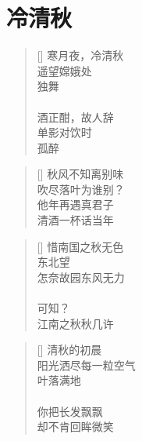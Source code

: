 \chapter{冷清秋}
\thispagestyle{empty}
\renewcommand{\poemtoc}{section}
\settowidth{\versewidth}{寒月夜，冷清秋}
\begin{verse}[\versewidth]
寒月夜，冷清秋\\
遥望嫦娥处\\
独舞\\
~\\
酒正酣，故人辞\\
单影对饮时\\
孤醉
\end{verse}

\renewcommand{\poemtoc}{section}
\settowidth{\versewidth}{秋风不知离别味}
\begin{verse}[\versewidth]
秋风不知离别味\\
吹尽落叶为谁别？\\
他年再遇真君子\\
清酒一杯话当年
\end{verse}

\renewcommand{\poemtoc}{section}
\settowidth{\versewidth}{惜南国之秋无色}
\begin{verse}[\versewidth]
惜南国之秋无色\\
东北望\\
怎奈故园东风无力\\
~\\
可知？\\
江南之秋秋几许
\end{verse}

\renewcommand{\poemtoc}{section}
\settowidth{\versewidth}{惜南国之秋无色}
\begin{verse}[\versewidth]
清秋的初晨\\
阳光洒尽每一粒空气\\
叶落满地\\
~\\
你把长发飘飘\\
却不肯回眸微笑
\end{verse}
\newpage

